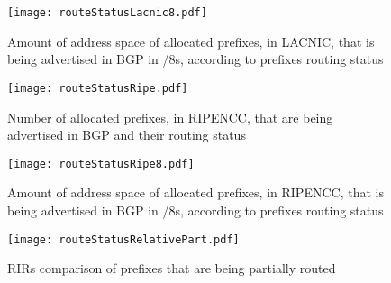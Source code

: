 \documentclass[11pt,a4paper]{scrreprt}
\begin{document}
\begin{appendices}
\begin{figure}[!h]
\centering
\texttt{[image: routeStatusLacnic8.pdf]}
\caption{Amount of address space of allocated prefixes, in LACNIC, that is being advertised in BGP in /8s, according to prefixes routing status}
\label{fig:routingStatusLacnic8}
\end{figure}



\begin{figure}[ht!]
\centering
\texttt{[image: routeStatusRipe.pdf]}
\caption{Number of allocated prefixes, in RIPENCC, that are being advertised in BGP and their routing status}
\label{fig:routingStatusRipe}
\end{figure}

\begin{figure}[ht!]
\centering
\texttt{[image: routeStatusRipe8.pdf]}
\caption{Amount of address space of allocated prefixes, in RIPENCC, that is being advertised in BGP in /8s, according to prefixes routing status}
\label{fig:routingStatusRipe8}
\end{figure}


\begin{figure}[!h]
\centering
\texttt{[image: routeStatusRelativePart.pdf]}
\caption{RIRs comparison of prefixes that are being partially routed}
\label{fig:routingStatusRelativePart}
\end{figure}

\end{appendices}
\end{document}
